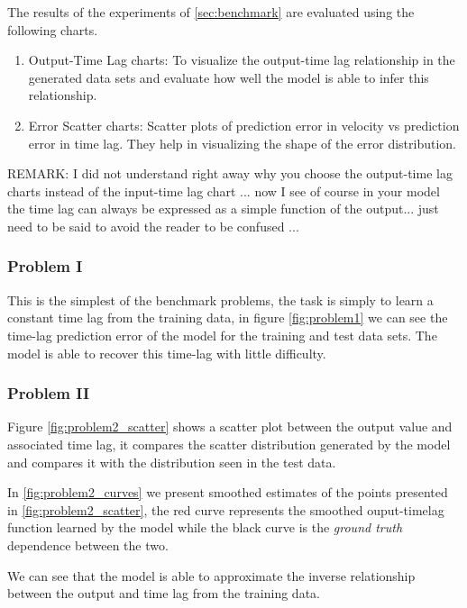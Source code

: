 \documentclass[twoside]{article}
\begin{document}
The results of the experiments of \ref{sec:benchmark} are evaluated using the following charts.

\begin{enumerate}
    \item Output-Time Lag charts: To visualize the output-time lag relationship in the generated data sets and evaluate how 
    well the model is able to infer this relationship.
    \item Error Scatter charts: Scatter plots of prediction error in velocity vs prediction error in time lag. They help in visualizing the
    shape of the error distribution.
\end{enumerate}

REMARK: I did not understand right away why you choose the output-time lag charts instead of the input-time lag chart ... now I see of course in your model the time lag can always be expressed as a simple function of the output... just need to be said to avoid the reader to be confused ...

\subsubsection{Problem I}

This is the simplest of the benchmark problems, the task is simply to learn a constant time lag from the training data, in figure \ref{fig:problem1} we can see the time-lag prediction error of the model for the training and test data sets. The model is able to recover this time-lag with little difficulty.


\subsubsection{Problem II}

Figure \ref{fig:problem2_scatter} shows a scatter plot between the output value and associated time lag, it compares the scatter distribution generated by the model and compares it with the distribution seen in the test data. 

In \ref{fig:problem2_curves} we present smoothed estimates of the points presented in \ref{fig:problem2_scatter}, the red curve represents the smoothed ouput-timelag function learned by the model while the black curve is the \emph{ground truth} dependence between the two. 

We can see that the model is able to approximate the inverse relationship between the output and time lag from the training data.
\end{document}
